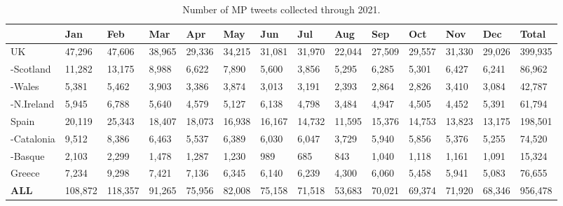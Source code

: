 \begin{table}[ht]
\begin{adjustbox}{width=\textwidth,center}
\begin{tabular}{|l|l|l|l|l|l|l|l|l|l|l|l|l|l|}
\hline
             & Jan & Feb & Mar & Apr & May   & Jun  & Jul  & Aug & Sep & Oct & Nov & Dec & \textbf{Total} \\ \hline
UK          & 47,296 & 47,606 & 38,965 & 29,336 & 34,215 & 31,081 & 31,970 & 22,044 & 27,509 & 29,557 & 31,330 & 29,026 & 399,935 \\ \hline
-Scotland  & 11,282 & 13,175 & 8,988  & 6,622  & 7,890  & 5,600  & 3,856  & 5,295  & 6,285  & 5,301  & 6,427  & 6,241  & 86,962  \\ \hline
-Wales     & 5,381  & 5,462  & 3,903  & 3,386  & 3,874  & 3,013  & 3,191  & 2,393  & 2,864  & 2,826  & 3,410  & 3,084  & 42,787  \\ \hline
-N.Ireland & 5,945  & 6,788  & 5,640  & 4,579  & 5,127  & 6,138  & 4,798  & 3,484  & 4,947  & 4,505  & 4,452  & 5,391  & 61,794  \\ \hline
Spain        & 20,119   & 25,343    & 18,407 & 18,073 & 16,938 & 16,167 & 14,732 & 11,595  & 15,376     & 14,753   & 13,823    & 13,175    & 198,501         \\ \hline
-Catalonia & 9,512  & 8,386  & 6,463  & 5,537  & 6,389  & 6,030  & 6,047  & 3,729  & 5,940  & 5,856  & 5,376  & 5,255  & 74,520  \\ \hline
-Basque    & 2,103  & 2,299  & 1,478  & 1,287  & 1,230  & 989   & 685   & 843   & 1,040  & 1,118  & 1,161  & 1,091  & 15,324  \\ \hline
Greece      & 7,234  & 9,298  & 7,421  & 7,136  & 6,345  & 6,140  & 6,239  & 4,300  & 6,060  & 5,458  & 5,941  & 5,083  & 76,655  \\ \hline
\textbf{ALL} & 108,872  & 118,357   & 91,265 & 75,956 & 82,008 & 75,158 & 71,518 & 53,683  & 70,021     & 69,374   & 71,920    & 68,346    &    956,478            \\ \hline
\end{tabular}
\end{adjustbox}
\caption{Number of MP tweets collected through 2021.}
\label{tab:Politics-tweets_collected}
\end{table}


